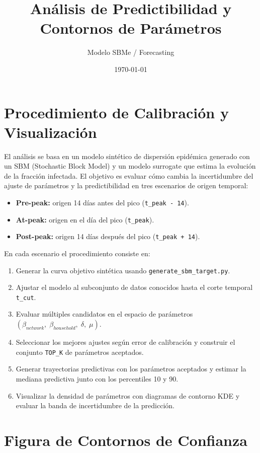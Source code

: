 \documentclass[12pt]{article}
\title{Análisis de Predictibilidad y Contornos de Parámetros}
\author{Modelo SBMe / Forecasting}
\date{\today}
\begin{document}
\maketitle

\section{Procedimiento de Calibración y Visualización}

El análisis se basa en un modelo sintético de dispersión epidémica generado con un SBM (Stochastic Block Model) y un modelo surrogate que estima la evolución de la fracción infectada. El objetivo es evaluar cómo cambia la incertidumbre del ajuste de parámetros y la predictibilidad en tres escenarios de origen temporal:

\begin{itemize}
  \item \textbf{Pre-peak:} origen 14 días antes del pico (\texttt{t\_peak - 14}).
  \item \textbf{At-peak:} origen en el día del pico (\texttt{t\_peak}).
  \item \textbf{Post-peak:} origen 14 días después del pico (\texttt{t\_peak + 14}).
\end{itemize}

En cada escenario el procedimiento consiste en:

\begin{enumerate}
  \item Generar la curva objetivo sintética usando \texttt{generate\_sbm\_target.py}.
  \item Ajustar el modelo al subconjunto de datos conocidos hasta el corte temporal \texttt{t\_cut}.
  \item Evaluar múltiples candidatos en el espacio de parámetros \((\beta_{network},\; \beta_{household},\; \delta,\; \mu)\).
  \item Seleccionar los mejores ajustes según error de calibración y construir el conjunto \texttt{TOP\_K} de parámetros aceptados.
  \item Generar trayectorias predictivas con los parámetros aceptados y estimar la mediana predictiva junto con los percentiles 10 y 90.
  \item Visualizar la densidad de parámetros con diagramas de contorno KDE y evaluar la banda de incertidumbre de la predicción.
\end{enumerate}

\section{Figura de Contornos de Confianza}
\end{document}
